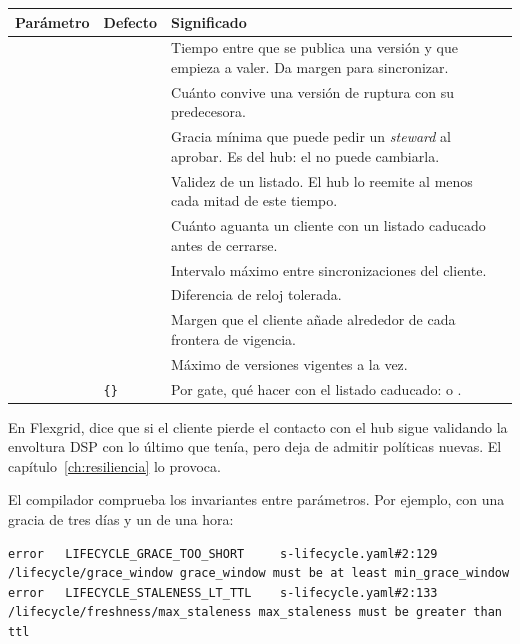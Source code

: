 \noindent\begin{tabularx}{\linewidth}{@{}L{5.1cm}C{1.5cm}Y@{}}
\toprule
\textbf{Parámetro} & \textbf{Defecto} & \textbf{Significado} \\
\midrule
{} &  & Tiempo entre que se publica una versión y que empieza a valer. Da margen para sincronizar. \\
 &  & Cuánto convive una versión de ruptura con su predecesora. \\
 &  & Gracia mínima que puede pedir un \emph{steward} al aprobar. Es del hub: el  no puede cambiarla. \\
 &  & Validez de un listado. El hub lo reemite al menos cada mitad de este tiempo. \\
 &  & Cuánto aguanta un cliente con un listado caducado antes de cerrarse. \\
 &  & Intervalo máximo entre sincronizaciones del cliente. \\
 &  & Diferencia de reloj tolerada. \\
 &  & Margen que el cliente añade alrededor de cada frontera de vigencia. \\
 &  & Máximo de versiones vigentes a la vez. \\
 & \texttt{\{\}} & Por gate, qué hacer con el listado caducado:  o . \\
\bottomrule
\end{tabularx}

\medskip
En Flexgrid,  dice que si el cliente pierde el contacto con el hub sigue validando la envoltura
DSP con lo último que tenía, pero deja de admitir políticas nuevas. El capítulo~\ref{ch:resiliencia} lo provoca.

El compilador comprueba los invariantes entre parámetros. Por ejemplo, con una gracia de tres días y un
 de una hora:

\begin{lstlisting}[style=out]
error   LIFECYCLE_GRACE_TOO_SHORT     s-lifecycle.yaml#2:129 /lifecycle/grace_window grace_window must be at least min_grace_window
error   LIFECYCLE_STALENESS_LT_TTL    s-lifecycle.yaml#2:133 /lifecycle/freshness/max_staleness max_staleness must be greater than ttl
\end{lstlisting}

